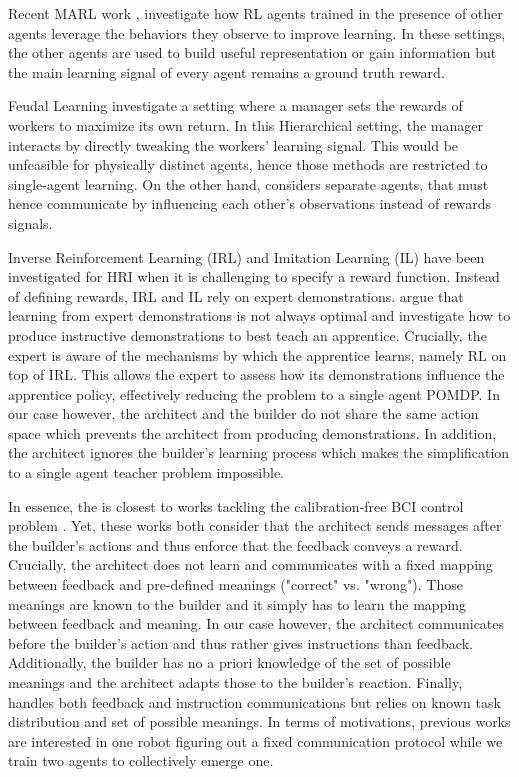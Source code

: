 Recent MARL work \cite{lowe2017multi,woodward2020learning, roy2020promoting, ndousse2021emergent}, investigate how RL agents trained in the presence of other agents leverage the behaviors they observe to improve learning. In these settings, the other agents are used to build useful representation or gain information but the main learning signal of every agent remains a ground truth reward. 

Feudal Learning \cite{dayan1992feudal, kulkarni2016hierarchical, vezhnevets2017feudal, nachum2018data,  ahilan2019feudal} investigate a setting where a manager sets the rewards of workers to maximize its own return. In this Hierarchical setting, the manager interacts by directly tweaking the workers' learning signal. This would be unfeasible for physically distinct agents, hence those methods are restricted to single-agent learning. On the other hand, \abp considers separate agents, that must hence communicate by influencing each other's observations instead of rewards signals. 

Inverse Reinforcement Learning (IRL) \cite{ng2000algorithms} and Imitation Learning (IL) \cite{pomerleau1991efficient} have been investigated for HRI when it is challenging to specify a reward function. Instead of defining rewards, IRL and IL rely on expert demonstrations. \cite{hadfield2016cooperative} argue that learning from expert demonstrations is not always optimal and investigate how to produce instructive demonstrations to best teach an apprentice. Crucially, the expert is aware of the mechanisms by which the apprentice learns, namely RL on top of IRL. This allows the expert to assess how its demonstrations influence the apprentice policy, effectively reducing the problem to a single agent POMDP. In our case however, the architect and the builder do not share the same action space which prevents the architect from producing demonstrations. In addition, the architect ignores the builder's learning process which makes the simplification to a single agent teacher problem impossible. 

In essence, the \abp is closest to works tackling the calibration-free BCI control problem \cite{grizou:hal-00984068, xie2021interaction}. Yet, these works both consider that the architect sends messages after the builder's actions and thus enforce that the feedback conveys a reward. Crucially, the architect does not learn and communicates with a fixed mapping between feedback and pre-defined meanings ("correct" vs. "wrong"). Those meanings are known to the builder and it simply has to learn the mapping between feedback and meaning. In our case however, the architect communicates before the builder's action and thus rather gives instructions than feedback. Additionally, the builder has no a priori knowledge of the set of possible meanings and the architect adapts those to the builder's reaction. Finally, \cite{grizou2013robot} handles both feedback and instruction communications but relies on known task distribution and set of possible meanings. In terms of motivations, previous works are interested in one robot figuring out a fixed communication protocol while we train two agents to collectively emerge one.

